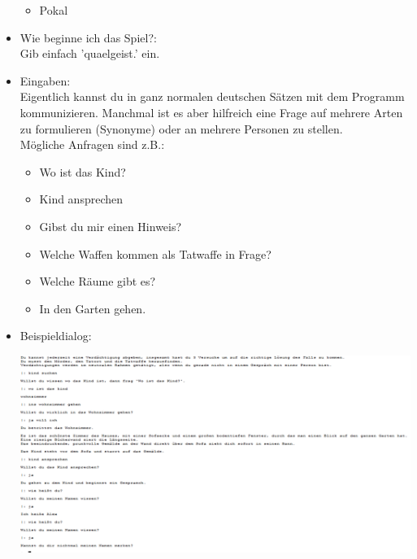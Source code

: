 \documentclass[10pt,a4paper]{article}
\begin{document}
\begin{itemize}
\begin{itemize}
\item Pokal
\end{itemize}
\item Wie beginne ich das Spiel?:\\
Gib einfach 'quaelgeist.' ein.
\item Eingaben:\\
Eigentlich kannst du in ganz normalen deutschen Sätzen mit dem Programm kommunizieren. Manchmal ist es aber hilfreich eine Frage auf mehrere Arten zu formulieren (Synonyme) oder an mehrere Personen zu stellen.\\
Mögliche Anfragen sind z.B.:\\
\begin{itemize}
\item Wo ist das Kind?
\item Kind ansprechen
\item Gibst du mir einen Hinweis?
\item Welche Waffen kommen als Tatwaffe in Frage?
\item Welche Räume gibt es?
\item In den Garten gehen.
\end{itemize}
\item Beispieldialog:\\
\begin{minipage}{0.5\textwidth}
\includegraphics[scale=0.7]{bild1.png}
\end{minipage}\\
\begin{minipage}{0.5\textwidth}

\end{minipage}
\end{itemize}
\end{document}
